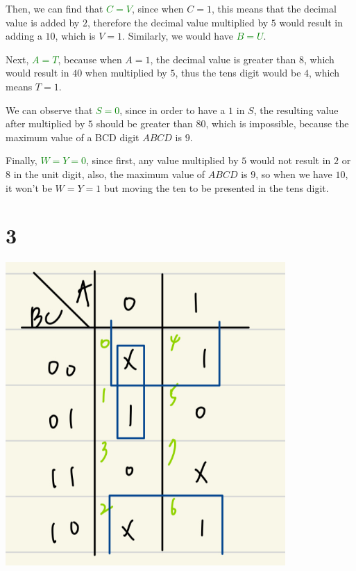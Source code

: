 \documentclass{article}
\begin{document}
\bigskip

Then, we can find that \textcolor{Green}{$C = V$}, since when $C = 1$, this means that the decimal value is added by $2$,
therefore the decimal value multiplied by $5$ would result in adding a $10$, which is $V = 1$. Similarly, we would have \textcolor{Green}{$B = U$}.

\bigskip

Next, \textcolor{Green}{$A = T$}, because when $A = 1$, the decimal value is greater than $8$, 
which would result in $40$ when multiplied by $5$, thus the tens digit would be $4$, which means $T = 1$.

\bigskip

We can observe that \textcolor{Green}{$S = 0$}, since in order to have a $1$ in $S$, the resulting value after multiplied by $5$ should be greater than $80$, 
which is impossible, because the maximum value of a BCD digit $ABCD$ is $9$.

\bigskip

Finally, \textcolor{Green}{$W = Y = 0$}, since first, any value multiplied by $5$ would not result in $2$ or $8$ in the unit digit,
also, the maximum value of $ABCD$ is $9$, so when we have $10$, it won't be $W = Y = 1$ but moving the ten to be presented in the tens digit. 
\newpage

\section*{3}    

\begin{center}
    \includegraphics[width=0.8\textwidth]{HW2_3_KMap}
\end{center}
\end{document}
